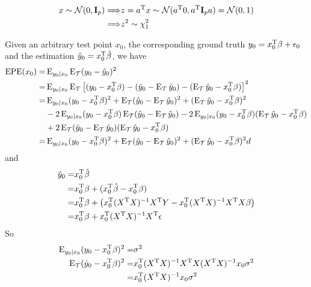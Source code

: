 \begin{sol}
\begin{align*}
x\sim\mathcal{N}(0,\mathbf{I}_p)\Longrightarrow & z=a^{\mathrm{T}}x\sim\mathcal{N}(a^{\mathrm{T}}0,a^{\mathrm{T}}\mathbf{I}_pa)=\mathcal{N}(0,1)\\
\Longrightarrow & z^2\sim \chi_1^2
\end{align*}
\end{sol}

\begin{sol}
Given an arbitrary test point $x_0$, the corresponding ground truth $y_0=x_0^{\mathrm{T}}\beta+\epsilon_0$ and the estimation $\hat{y}_0=x_0^{\mathrm{T}}\hat{\beta}$, we have
\begin{align*}
\mathrm{EPE}(x_0) = & \operatorname{E}_{y_0\vert x_0}\operatorname{E}_{\mathcal{T}}(y_0-\hat{y}_0)^2\\
=& \operatorname{E}_{y_0\vert x_0}\operatorname{E}_{\mathcal{T}}\left[(y_0-x_0^{\mathrm{T}}\beta)-(\hat{y}_0-\operatorname{E}_\mathcal{T}\hat{y}_0)-(\operatorname{E}_\mathcal{T}\hat{y}_0-x_0^{\mathrm{T}}\beta)\right]^2 \\
=& \operatorname{E}_{y_0\vert x_0}(y_0-x_0^{\mathrm{T}}\beta)^2+\operatorname{E}_{\mathcal{T}}(\hat{y}_0-\operatorname{E}_\mathcal{T}\hat{y}_0)^2+(\operatorname{E}_\mathcal{T}\hat{y}_0-x_0^{\mathrm{T}}\beta)^2 \\
& -2 \operatorname{E}_{y_0\vert x_0}(y_0-x_0^{\mathrm{T}}\beta) \operatorname{E}_{\mathcal{T}}(\hat{y}_0-\operatorname{E}_\mathcal{T}\hat{y}_0) -2 \operatorname{E}_{y_0\vert x_0}(y_0-x_0^{\mathrm{T}}\beta) (\operatorname{E}_\mathcal{T}\hat{y}_0-x_0^{\mathrm{T}}\beta) \\
& +2 \operatorname{E}_{\mathcal{T}}(\hat{y}_0-\operatorname{E}_\mathcal{T}\hat{y}_0)(\operatorname{E}_\mathcal{T}\hat{y}_0-x_0^{\mathrm{T}}\beta) \\
=& \operatorname{E}_{y_0\vert x_0}(y_0-x_0^{\mathrm{T}}\beta)^2+\operatorname{E}_{\mathcal{T}}(\hat{y}_0-\operatorname{E}_\mathcal{T}\hat{y}_0)^2+(\operatorname{E}_\mathcal{T}\hat{y}_0-x_0^{\mathrm{T}}\beta)^2d
\end{align*}
and
\begin{align*}
\hat{y}_0 =& x_0^{\mathrm{T}}\hat{\beta}\\
=& x_0^{\mathrm{T}}\beta + (x_0^{\mathrm{T}}\hat{\beta}-x_0^{\mathrm{T}}\beta)\\
=& x_0^{\mathrm{T}}\beta + \left(x_0^{\mathrm{T}}(X^{\mathrm{T}}X)^{-1}X^{\mathrm{T}}Y-x_0^{\mathrm{T}}(X^{\mathrm{T}}X)^{-1}X^{\mathrm{T}}X\beta\right) \\
=& x_0^{\mathrm{T}}\beta + x_0^{\mathrm{T}}(X^{\mathrm{T}}X)^{-1}X^{\mathrm{T}}\epsilon
\end{align*}
So
\begin{align*}
\E_{y_0\vert x_0}(y_0-\Tr{x_0}\beta)^2 =& \sigma^2 \\
\E_\mathcal{T} (\hat{y}_0-\Tr{x_0}\beta)^2 =& \Tr{x_0}(\Tr{X}X)^{-1}\Tr{X}X(\Tr{X}X)^{-1}x_0\sigma^2 \\
=& \Tr{x_0}(\Tr{X}X)^{-1}x_0\sigma^2 \\

\end{align*}
\end{sol}
